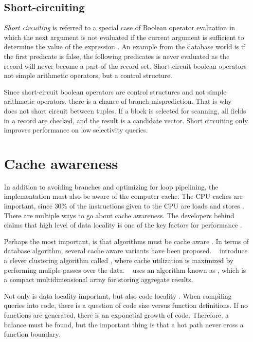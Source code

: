 \subsection{Short-circuiting}
\label{sub:Short-circuiting}
\textit{Short circuiting} is referred to a special case of Boolean operator evaluation in which the next argument is not evaluated if the current argument is sufficient to determine the value of the expression \cite{Wikipedia_contributors2015-rk}. An example from the database world is if the first predicate is false, the following predicates is never evaluated as the record will never become a part of the record set. Short circuit boolean operators not simple arithmetic operators, but a control structure.

Since short-circuit boolean operators are control structures and not simple arithmetic operators, there is a chance of branch misprediction. That is why \blink~\cite{Raman2008-gi, Johnson2008-cp} does not short circuit between tuples. If a block is selected for scanning, all fields in a record are checked, and the result is a candidate vector. Short circuiting only improves performance on low selectivity queries.

\section{Cache awareness}
\label{sec:Cache awareness}
In addition to avoiding branches and optimizing for loop pipelining, the implementation must also be aware of the computer cache. The CPU caches are important, since 30\% of the instructions given to the CPU are loads and stores \cite{Boncz2005-wj}. There are multiple ways to go about cache awareness. The developers behind \exasol claims that high level of data locality is one of the key factors for performance \cite{Exasol2014-xh}.

Perhaps the most important, is that algorithms must be cache aware \cite{Farber2012-vh}. In terms of database algorithm, several cache aware variants have been proposed. \monetdb~\cite{Boncz2002-yj} introduce a clever clustering algorithm called , where cache utilization is maximized by performing muliple passes over the data. \oracle~\cite{Lahiri2015-mz} uses an algorithm known as , which is a compact multidimensional array for storing aggregate results.

Not only is data locality important, but also code locality \cite{Neumann2011-uq}. When compiling queries into code, there is a question of code size versus function definitions. If no functions are generated, there is an exponetial growth of code. Therefore, a balance must be found, but the important thing is that a hot path never cross a function boundary.


